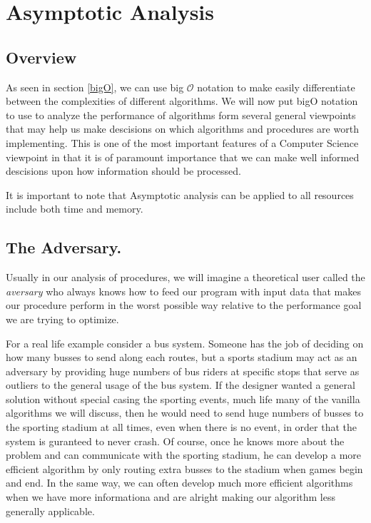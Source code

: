 \documentclass[12pt, letterpaper]{book}
\newcommand{\bigO}{\mathcal{O}}
\begin{document}
	\section{Asymptotic Analysis} \label{asymptotic analysis}

		\subsection{Overview}
			As seen in section \ref{bigO}, we can use big $\bigO$ notation to make easily differentiate between the complexities of different algorithms. We will now put bigO notation to use to analyze the performance of algorithms form several general viewpoints that may help us make descisions on which algorithms and procedures are worth implementing. This is one of the most important features of a Computer Science viewpoint in that it is of paramount importance that we can make well informed descisions upon how information should be processed.

It is important to note that Asymptotic analysis can be applied to all resources include both time and memory.

		\subsection{The Adversary.}

Usually in our analysis of procedures, we will imagine a theoretical user called the \textit{aversary} who always knows how to feed our program with input data that makes our procedure perform in the worst possible way relative to the performance goal we are trying to optimize.

For a real life example consider a bus system. Someone has the job of deciding on how many busses to send along each routes, but a sports stadium may act as an adversary by providing huge numbers of bus riders at specific stops that serve as outliers to the general usage of the bus system. If the designer wanted a general solution without special casing the sporting events, much life many of the vanilla algorithms we will discuss, then he would need to send huge numbers of busses to the sporting stadium at all times, even when there is no event, in order that the system is guranteed to never crash. Of course, once he knows more about the problem and can communicate with the sporting stadium, he can develop a more efficient algorithm by only routing extra busses to the stadium when games begin and end. In the same way, we can often develop much more efficient algorithms when we have more informationa and are alright making our algorithm less generally applicable.
\end{document}
